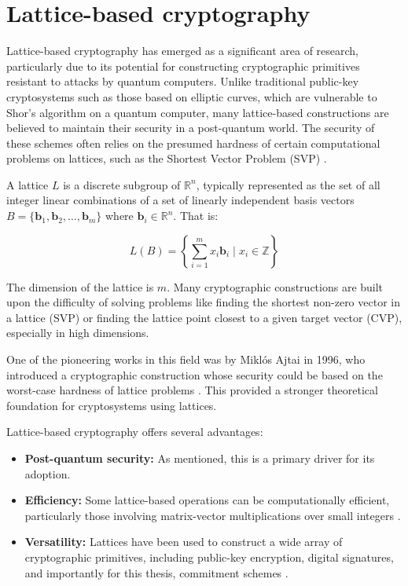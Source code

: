 \section{Lattice-based cryptography}

Lattice-based cryptography has emerged as a significant area of research,
particularly due to its potential for constructing cryptographic primitives
resistant to attacks by quantum computers. Unlike traditional public-key
cryptosystems such as those based on elliptic curves, which are vulnerable to
Shor's algorithm on a quantum computer, many lattice-based constructions are
believed to maintain their security in a post-quantum world. The security of
these schemes often relies on the presumed hardness of certain computational
problems on lattices, such as the Shortest Vector Problem (SVP) \cite{AjtaiLattices, LatticeTutorial}.

A lattice $L$ is a discrete subgroup of $\mathbb{R}^n$, typically
represented as the set of all integer linear combinations of a set of linearly
independent basis vectors $B = \{\mathbf{b}_1, \mathbf{b}_2, \dots, \mathbf{b}_m\}$
where $\mathbf{b}_i \in \mathbb{R}^n$. That is:

\[
	L(B) = \left\{ \sum_{i=1}^{m} x_i \mathbf{b}_i \mid x_i \in \mathbb{Z} \right\}
\]

The dimension of the lattice is $m$. Many cryptographic constructions are
built upon the difficulty of solving problems like finding the shortest
non-zero vector in a lattice (SVP) or finding the lattice point closest to a
given target vector (CVP), especially in high dimensions.

One of the pioneering works in this field was by Miklós Ajtai in 1996, who
introduced a cryptographic construction whose security could be based on the
worst-case hardness of lattice problems \cite{AjtaiLattices}. This provided a
stronger theoretical foundation for cryptosystems using lattices.

Lattice-based cryptography offers several advantages:

\begin{itemize}
    \item \textbf{Post-quantum security:} As mentioned, this is a primary driver for its adoption.
    \item \textbf{Efficiency:} Some lattice-based operations can be
		computationally efficient, particularly those involving matrix-vector
		multiplications over small integers \cite{LatticeTutorial}.
    \item \textbf{Versatility:} Lattices have been used to construct a wide
		array of cryptographic primitives, including public-key encryption,
		digital signatures, and importantly for this thesis, commitment
		schemes \cite{LatticeTutorial}.
\end{itemize}

